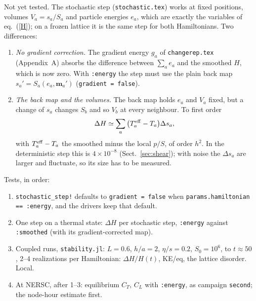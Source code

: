 \documentclass[11pt,aps,preprint,nofootinbib,superscriptaddress,tightenlines]{revtex4-2}
\def\st{\begin{equation}}
\def\stp{\end{equation}}
\def\Eq#1{eq.~(\ref{#1})}
\def\Sect#1{Sect.~\ref{#1}}
\begin{document}
Not yet tested.  The stochastic step (\texttt{stochastic.tex}) works at fixed positions,
volumes $V_a=s_a/S_a$ and particle energies $e_a$, which are exactly the variables of
\Eq{H}; on a frozen lattice it is the same step for both Hamiltonians.  Two differences:
\begin{enumerate}
\item \emph{No gradient correction.}  The gradient energy $g_a$ of \texttt{changerep.tex}
  (Appendix~A) absorbs the difference between $\sum_ae_a$ and the smoothed $H$, which is
  now zero.  With \texttt{:energy} the step must use the plain back map
  $s_a'=S_a(e_a,\bm m_a')$ (\texttt{gradient = false}).
\item \emph{The back map and the volumes.}  The back map holds $e_a$ and $V_a$ fixed, but a
  change of $s_a$ changes $S_b$ and so $V_b$ at every neighbour.  To first order
  \st
  \Delta H\simeq\sum_a\big(T^{\rm eff}_a-T_a\big)\Delta s_a ,
  \stp
  with $T^{\rm eff}_a-T_a$ the smoothed minus the local $p/S$, of order $h^2$.  In the
  deterministic step this is $4\times10^{-8}$ (\Sect{sec:shear}); with noise the $\Delta s_a$
  are larger and fluctuate, so its size has to be measured.
\end{enumerate}
Tests, in order:
\begin{enumerate}
\item \texttt{stochastic\_step!} defaults to \texttt{gradient = false} when
  \texttt{params.hamiltonian == :energy}, and the drivers keep that default.
\item One step on a thermal state: $\Delta H$ per stochastic step, \texttt{:energy} against
  \texttt{:smoothed} (with its gradient-corrected map).
\item Coupled runs, \texttt{stability.jl}: $L=0.6$, $h/a=2$, $\eta/s=0.2$,
  $S_0=10^6$, to $t\approx50$, 2--4 realizations per Hamiltonian: $\Delta H/H(t)$,
  KE/eq, the lattice disorder.  Local.
\item At NERSC, after 1--3: equilibrium $C_T$, $C_L$ with \texttt{:energy}, as campaign
  \texttt{second}; the node-hour estimate first.
\end{enumerate}
\end{document}
